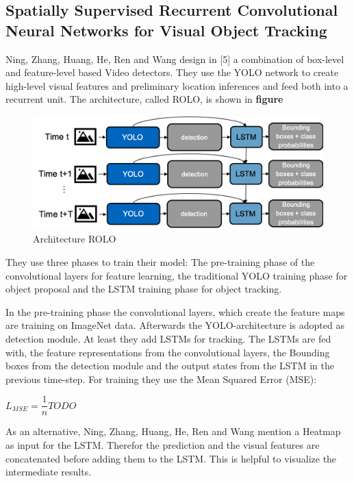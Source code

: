 \documentclass[conference]{IEEEtran}
\begin{document}
\subsection{Spatially Supervised Recurrent Convolutional Neural Networks for Visual Object Tracking}
Ning, Zhang, Huang, He, Ren and Wang design in [5] a combination of box-level and feature-level based Video detectors. They use the YOLO network to create high-level visual features and preliminary location inferences and feed both into a recurrent unit. The architecture, called ROLO, is shown in \textbf{figure} 

\begin{figure} [h]
\includegraphics[width=\columnwidth]{ROLO}
\caption{Architecture ROLO}
\end{figure}

They use three phases to train their model: The pre-training phase of the convolutional layers for feature learning, the traditional YOLO training phase for object proposal and the LSTM training phase for object tracking.  \newline

In the pre-training phase the convolutional layers, which create the feature maps are training on ImageNet data. Afterwards the YOLO-architecture is adopted as detection module. At least they add LSTMs for tracking. The LSTMs are fed with, the feature representations from the convolutional layers, the Bounding boxes from the detection module and the output states from the LSTM in the previous time-step. For training they use the Mean Squared Error (MSE): \newline

$ L_{MSE} = \dfrac{1}{n} TODO $ \newline

As an alternative, Ning, Zhang, Huang, He, Ren and Wang mention a Heatmap as  input for the LSTM. Therefor the prediction and the visual features are concatenated before adding them to the LSTM. This is helpful to visualize the intermediate results. \newline
\end{document}
